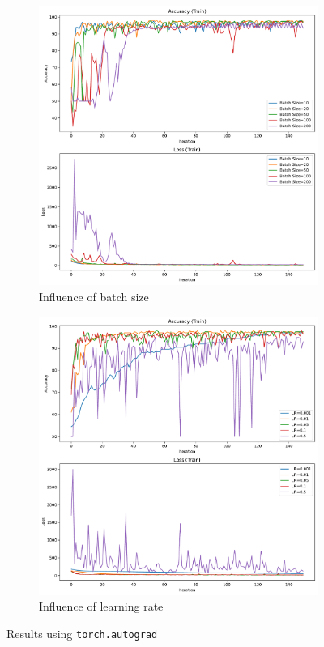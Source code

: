 \begin{figure}[H]\ContinuedFloat
    \centering
    \begin{subfigure}{0.45\textwidth}
        \centering
        \includegraphics[width=\textwidth]{figs/NN/autograd_batchsize.pdf}
        \caption{Influence of batch size}
        \label{subfig:autograd_batchsize}
    \end{subfigure}
    \begin{subfigure}{0.45\textwidth}
        \centering
        \includegraphics[width=\textwidth]{figs/NN/autograd_lr.pdf}
        \caption{Influence of learning rate}
        \label{subfig:autograd_lr}
    \end{subfigure}
    \caption{Results using \texttt{torch.autograd}}
    \label{fig:autograd}
\end{figure}

